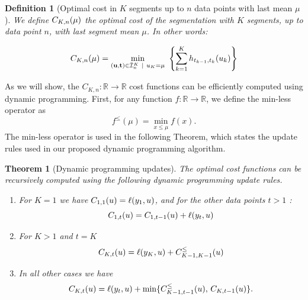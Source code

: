\documentclass{article}
\newtheorem{theorem}{Theorem}
\newtheorem{definition}{Definition}
\newcommand{\RR}{\mathbb R}
\begin{document}


\begin{definition}[Optimal cost in $K$ segments up to $n$ data points with last mean $\mu$]
\label{def:fcc}
  We define $C_{K,n}(\mu)$ the optimal cost of the segmentation
  with $K$ segments, up to data point $n$, with last segment mean
  $\mu$. In other words:

\begin{equation}
C_{K,n}(\mu) = \min_{(\mathbf u, \mathbf t)\in\bar{\mathcal I}_n^K \ | \ u_K = \mu} \
  \left\{ \sum_{k=1}^K
  h_{t_{k-1}, t_k}(u_k) \right\}
\end{equation}
\end{definition}

As we will show, the $C_{K,n}:\RR\rightarrow\RR$ cost functions can be
efficiently computed using dynamic programming.
First, for any function
$f:\RR\rightarrow\RR$, we define the min-less operator as
\begin{equation}
  \label{eq:min-less-def}
  f^\leq(\mu)=\min_{x\leq \mu} f(x).
\end{equation}
The min-less operator is used in the following Theorem, which states
the update rules used in our proposed dynamic programming algorithm.

\begin{theorem}[Dynamic programming updates]
  The optimal cost functions can be recursively computed using the
  following dynamic programming update rules.
\begin{enumerate}
\item For $K=1$ we have
$C_{1,1}(u)=\ell(y_1,u)$, and for the other data
  points $t>1$ :
\begin{equation}
C_{1,t}(u)=C_{1,t-1}(u)+\ell(y_t,u)
\end{equation}

\item For $K>1$ and $t=K$
\begin{equation}
  C_{K,t}(u)=\ell(y_K, u)+C_{K-1,K-1}^\leq(u)
\end{equation}
\item In all other cases we have
  \begin{equation}
  C_{K,t}(u)=\ell(y_t,u)+
  \min\{
  C_{K-1,t-1}^\leq(u),\,
  C_{K,t-1}(u)
  \}.
  \end{equation}
\end{enumerate}
\end{theorem}
\end{document}
